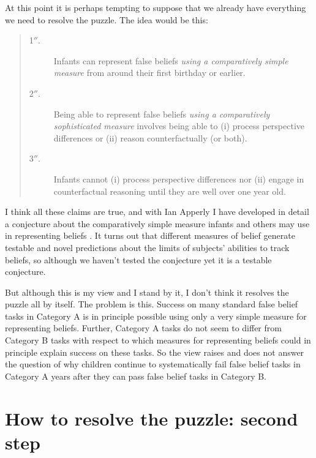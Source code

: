 \documentclass[12pt,\papersize]{extarticle}
\begin{document}
At this point it is perhaps tempting to suppose that we already have everything we need to resolve the puzzle.
The idea would be this:
%
\begin{quote}
\begin{description}
\item[1$''$.] Infants can represent false beliefs \emph{using a comparatively simple measure} from around their first birthday or earlier.
%
\item[2$''$.] Being able to represent false beliefs \emph{using a comparatively sophisticated measure}  involves being able to  (i) process perspective differences or (ii) reason counterfactually (or both). 
%
\item[3$''$.] Infants cannot (i) process perspective differences nor (ii) engage in counterfactual reasoning until they are well over one year old.  
\end{description}
\end{quote}
%
I think all these claims are true, and with Ian Apperly I have developed in detail a conjecture about the comparatively simple measure infants and others may use in representing beliefs \citep{butterfill_minimal}.
It turns out that different measures of belief generate testable and novel predictions about the limits of subjects' abilities to track beliefs, so although we haven't tested the conjecture yet it is a testable conjecture.

But although this is my view and I stand by it, I don't think it resolves the puzzle all by itself.
The problem is this.
Success on many standard false belief tasks in Category A is in principle possible using only a very simple measure for representing beliefs.
Further, Category A tasks do not seem to differ from Category B tasks with respect to which measures for representing beliefs could in principle explain success on these tasks.
So the view raises and does not answer the question of why children continue to systematically fail false belief tasks in Category A years after they can pass false belief tasks in Category B.



\section{How to resolve the puzzle: second step}
\end{document}

